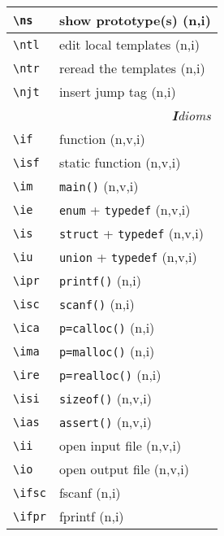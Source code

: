 \documentclass[oneside,11pt,landscape,DIV16]{scrartcl}
\begin{document}
\begin{multicols}{3}
\begin{center}
\begin{tabular}[]{|p{11mm}|p{60mm}|}
\hline     \verb'\ns'  & show   prototype(s)       \hfill (n,i)\\
%
\hline     \verb'\ntl' & edit local templates      \hfill (n,i)\\
\hline     \verb'\ntr' & reread the templates      \hfill (n,i)\\
\hline     \verb'\njt' & insert jump tag           \hfill (n,i)\\
\hline
\hline 
\multicolumn{2}{|r|}{\textsl{\textbf{I}dioms}}   \\
\hline \verb'\if'  & function                           \hfill (n,v,i)\\
\hline \verb'\isf' & static function                    \hfill (n,v,i)\\
\hline \verb'\im'  & \verb'main()'                      \hfill (n,v,i)\\
\hline \verb'\ie'  & \verb'enum'   + \verb'typedef'     \hfill (n,v,i)\\
\hline \verb'\is'  & \verb'struct' + \verb'typedef'     \hfill (n,v,i)\\
\hline \verb'\iu'  & \verb'union'  + \verb'typedef'     \hfill (n,v,i)\\
\hline \verb'\ipr' & \verb'printf()'                    \hfill (n,i)\\
\hline \verb'\isc' & \verb'scanf()'                     \hfill (n,i)\\
\hline \verb'\ica' & \verb'p=calloc()'                  \hfill (n,i)\\
\hline \verb'\ima' & \verb'p=malloc()'                  \hfill (n,i)\\
\hline \verb'\ire' & \verb'p=realloc()'                 \hfill (n,i)\\
\hline \verb'\isi' & \verb'sizeof()'                    \hfill (n,v,i)\\
\hline \verb'\ias' & \verb'assert()'                    \hfill (n,v,i)\\
\hline \verb'\ii'  & open input file                    \hfill (n,v,i)\\
\hline \verb'\io'  & open output file                   \hfill (n,v,i)\\
\hline \verb'\ifsc'& fscanf                             \hfill (n,i)\\
\hline \verb'\ifpr'& fprintf                            \hfill (n,i)\\

\end{tabular}
\end{center}
\end{multicols}
\end{document}
